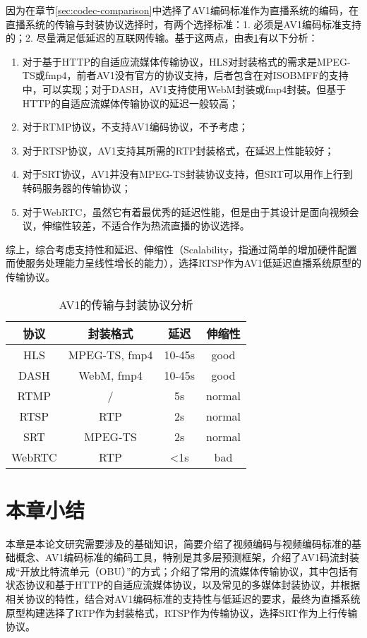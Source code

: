 因为在章节\ref{sec:codec-comparison}中选择了AV1编码标准作为直播系统的编码，在直播系统的传输与封装协议选择时，有两个选择标准：1. 必须是AV1编码标准支持的；2. 尽量满足低延迟的互联网传输。基于这两点，由表\ref{tab:protocol}有以下分析：

\begin{enumerate} [label=\arabic*)]
  \item 对于基于HTTP的自适应流媒体传输协议，HLS对封装格式的需求是MPEG-TS或fmp4，前者AV1没有官方的协议支持，后者包含在对ISOBMFF的支持中，可以实现；对于DASH，AV1支持使用WebM封装或fmp4封装。但基于HTTP的自适应流媒体传输协议的延迟一般较高；
  \item 对于RTMP协议，不支持AV1编码协议，不予考虑；
  \item 对于RTSP协议，AV1支持其所需的RTP封装格式，在延迟上性能较好；
  \item 对于SRT协议，AV1并没有MPEG-TS封装协议支持，但SRT可以用作上行到转码服务器的传输协议；
  \item 对于WebRTC，虽然它有着最优秀的延迟性能，但是由于其设计是面向视频会议，伸缩性较差，不适合作为热流直播的协议选择。
\end{enumerate}

综上，综合考虑支持性和延迟、伸缩性（Scalability，指通过简单的增加硬件配置而使服务处理能力呈线性增长的能力），选择RTSP作为AV1低延迟直播系统原型的传输协议。

\begin{table}[!hpt]
  \caption{AV1的传输与封装协议分析}
  \label{tab:protocol}
  \centering
  \begin{tabular}{cccc} \toprule
    协议     & 封装格式       & 延迟     & 伸缩性\\ \midrule
    HLS     & MPEG-TS, fmp4 & 10-45s  & good  \\
    DASH    & WebM, fmp4    & 10-45s  & good  \\
    RTMP    & /             & 5s      & normal \\
    RTSP    & RTP           & 2s      & normal \\
    SRT     & MPEG-TS       & 2s      & normal \\
    WebRTC  & RTP           & <1s     & bad    \\ \bottomrule
  \end{tabular}
\end{table}




\section{本章小结}

本章是本论文研究需要涉及的基础知识，简要介绍了视频编码与视频编码标准的基础概念、AV1编码标准的编码工具，特别是其多层预测框架，介绍了AV1码流封装成“开放比特流单元（OBU）”的方式；介绍了常用的流媒体传输协议，其中包括有状态协议和基于HTTP的自适应流媒体协议，以及常见的多媒体封装协议，并根据相关协议的特性，结合对AV1编码标准的支持性与低延迟的要求，最终为直播系统原型构建选择了RTP作为封装格式，RTSP作为传输协议，选择SRT作为上行传输协议。